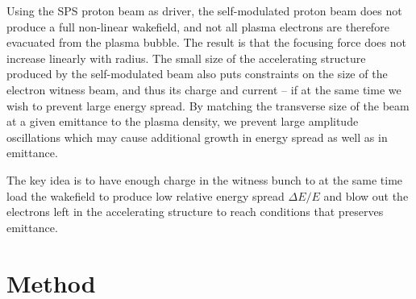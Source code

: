 \documentclass[aps,prstab,reprint,amsmath,amssymb,groupedaddress]{revtex4-1}
\newcommand{\unit}[1]{\,\mathrm{#1}}
\begin{document}
Using the SPS proton beam as driver, the self-modulated proton beam does not produce a full non-linear wakefield, and
not all plasma electrons are therefore evacuated from the plasma bubble. The result is that the focusing force does not
increase linearly with radius. The small size of the accelerating structure produced by the self-modulated beam also
puts constraints on the size of the electron witness beam, and thus its charge and current -- if at the same time we
wish to prevent large energy spread. By matching the transverse size of the beam at a given emittance to the plasma
density, we prevent large amplitude oscillations which may cause additional growth in energy spread as well as in
emittance.

The key idea is to have enough charge in the witness bunch to at the same time load the wakefield to produce low
relative energy spread $\Delta E/E$ and blow out the electrons left in the accelerating structure to reach conditions
that preserves emittance.


\section[\label{S:M}]{Method}
\end{document}
